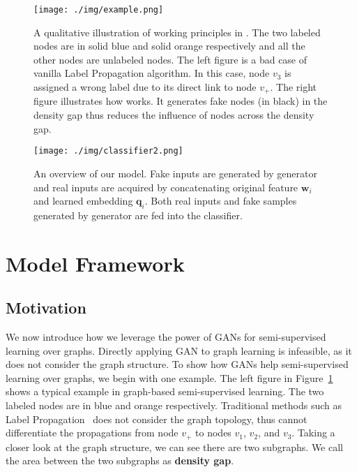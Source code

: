 \begin{figure}[t]
	\centering
	\texttt{[image: ./img/example.png]}%
	\caption{A qualitative illustration of  working principles in \model. 
		The two labeled nodes are in solid blue and solid orange respectively and all the other nodes are unlabeled nodes.	
		The left figure is a bad case of vanilla Label Propagation algorithm. In this case, node $v_3$ is assigned a wrong label due to its direct link to  node $v_+$. 
		The right figure illustrates how \smodel works. It generates fake nodes (in black) in the density gap thus reduces the influence of nodes across the density gap.
}\label{example}
\end{figure}

 \begin{figure*}
 \centering
 \texttt{[image: ./img/classifier2.png]}%
 \caption{An overview of our model. Fake inputs are generated by generator and real inputs are acquired by concatenating original feature $\mathbf{w}_i$ and learned embedding $\mathbf{q}_i$. Both real inputs and fake samples generated by generator are fed into the classifier.}\label{overview}
 \end{figure*}
 
\section{Model Framework}
\label{sec:gen_fs}

\subsection{Motivation}
\label{sec:mot}
We now introduce how we leverage the power of GANs for semi-supervised learning over graphs. Directly applying GAN to graph learning is infeasible, as it does not consider the graph structure. To show how GANs help semi-supervised learning over graphs, we begin with one example. The left figure in Figure~\ref{example} shows a typical example in graph-based semi-supervised learning. The two labeled nodes are in blue and orange respectively. Traditional methods such as Label Propagation~\cite{zhu2002learning} does not consider the graph topology, thus cannot differentiate the propagations from node $v_+$ to nodes $v_1$, $v_2$, and $v_3$. 
Taking a closer look at the graph structure, we can see there are two subgraphs. We call the area between the two subgraphs as \textbf{density gap}.

